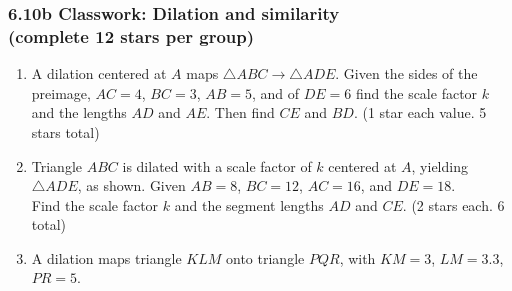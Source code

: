 \documentclass[12pt, twoside]{article}
\begin{document}
\subsubsection*{6.10b Classwork: Dilation and similarity\\[0.25cm]
(complete 12 stars per group)}
  \begin{enumerate}

  \item A dilation centered at $A$ maps $\triangle ABC \rightarrow \triangle ADE$. Given the sides of the preimage, $AC = 4$, $BC = 3$, $AB = 5$, and of $DE = 6$ find the scale factor $k$ and the lengths $AD$ and $AE$. Then find $CE$ and $BD$. \hfill (1 star each value. 5 stars total)
    \begin{flushright}
    \end{flushright} \vspace{1.5cm}

  \item Triangle $ABC$ is dilated with a scale factor of $k$ centered at $A$, yielding $\triangle ADE$, as shown. Given $AB=8$, $BC=12$, $AC=16$, and $DE=18$. \\[0.25cm] Find the scale factor $k$ and the segment lengths $AD$ and $CE$. \hfill (2 stars each. 6 total)
    \begin{flushright}
    \end{flushright} \vspace{2.5cm}

\newpage
  \item A dilation maps triangle $KLM$ onto triangle $PQR$, with $KM=3$, $LM=3.3$, $PR=5$. \vspace{0.5cm}
    \begin{multicols}{2}
\end{multicols}
\end{enumerate}
\end{document}
